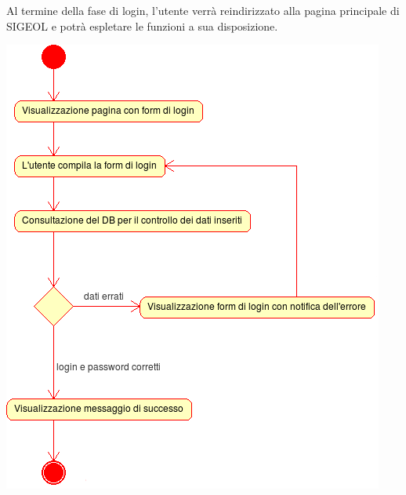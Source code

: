 \documentclass[11pt,a4paper]{article}
\begin{document}
Al termine della fase di login, l'utente verrà reindirizzato alla pagina principale di SIGEOL e potrà espletare le funzioni a sua disposizione.\\
\begin{center}
 \includegraphics[scale=1]{images/login.png}
\end{center}

\newpage
\end{document}
